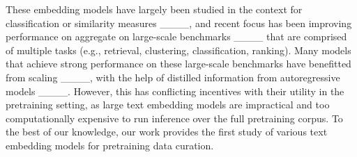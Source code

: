 These embedding models have largely been studied in the context for classification or similarity measures ____, and recent focus has been improving performance on aggregate on large-scale benchmarks ____ that are comprised of multiple tasks (e.g., retrieval, clustering, classification, ranking). 
Many models that achieve strong performance on these large-scale benchmarks have benefitted from scaling ____, with the help of distilled information from autoregressive models ____. 
However, this has conflicting incentives with their utility in the pretraining setting, as large text embedding models are impractical and too computationally expensive to run inference over the full pretraining corpus. 
To the best of our knowledge, our work provides the first study of various text embedding models for pretraining data curation.